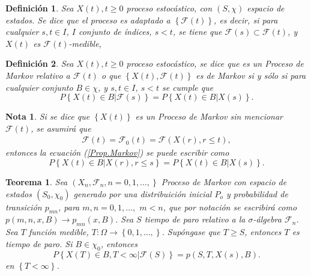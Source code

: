 \documentclass{article}
\newtheorem{Def}{Definición}[section]
\newtheorem{Teo}{Teorema}[section]
\newtheorem{Note}{Nota}[section]
\numberwithin{equation}{section}
\begin{document}
\begin{Def}
Sea $X\left(t\right),t\geq0$ proceso estoc\'astico, con $\left(S,\chi\right)$ espacio de estados. Se dice que el proceso es adaptado a $\left\{\mathcal{F}\left(t\right)\right\}$, es decir, si para cualquier $s,t\in I$, $I$ conjunto de \'indices, $s<t$, se tiene que $\mathcal{F}\left(s\right)\subset\mathcal{F}\left(t\right)$, y $X\left(t\right)$ es $\mathcal{F}\left(t\right)$-medible,
\end{Def}

\begin{Def}
Sea $X\left(t\right),t\geq0$ proceso estoc\'astico, se dice que es un Proceso de Markov relativo a $\mathcal{F}\left(t\right)$ o que $\left\{X\left(t\right),\mathcal{F}\left(t\right)\right\}$ es de Markov si y s\'olo si para cualquier conjunto $B\in\chi$,  y $s,t\in I$, $s<t$ se cumple que
\begin{equation}\label{Prop.Markov}
P\left\{X\left(t\right)\in B|\mathcal{F}\left(s\right)\right\}=P\left\{X\left(t\right)\in B|X\left(s\right)\right\}.
\end{equation}
\end{Def}

\begin{Note}
Si se dice que $\left\{X\left(t\right)\right\}$ es un Proceso de Markov sin mencionar $\mathcal{F}\left(t\right)$, se asumir\'a que 
\begin{eqnarray*}
\mathcal{F}\left(t\right)=\mathcal{F}_{0}\left(t\right)=\mathcal{F}\left(X\left(r\right),r\leq t\right),
\end{eqnarray*}
entonces la ecuaci\'on (\ref{Prop.Markov}) se puede escribir como
\begin{equation}
P\left\{X\left(t\right)\in B|X\left(r\right),r\leq s\right\} = P\left\{X\left(t\right)\in B|X\left(s\right)\right\}.
\end{equation}
\end{Note}

\begin{Teo}
Sea $\left(X_{n},\mathcal{F}_{n},n=0,1,\ldots,\right\}$ Proceso de Markov con espacio de estados $\left(S_{0},\chi_{0}\right)$ generado por una distribuici\'on inicial $P_{o}$ y probabilidad de transici\'on $p_{mn}$, para $m,n=0,1,\ldots,$ $m<n$, que por notaci\'on se escribir\'a como $p\left(m,n,x,B\right)\rightarrow p_{mn}\left(x,B\right)$. Sea $S$ tiempo de paro relativo a la $\sigma$-\'algebra $\mathcal{F}_{n}$. Sea $T$ funci\'on medible, $T:\Omega\rightarrow\left\{0,1,\ldots,\right\}$. Sup\'ongase que $T\geq S$, entonces $T$ es tiempo de paro. Si $B\in\chi_{0}$,
entonces
\begin{equation}\label{Prop.Fuerte.Markov}
P\left\{X\left(T\right)\in B,T<\infty|\mathcal{F}\left(S\right)\right\} = p\left(S,T,X\left(s\right),B\right).
\end{equation}
en $\left\{T<\infty\right\}$.
\end{Teo}
\end{document}
